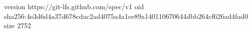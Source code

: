 version https://git-lfs.github.com/spec/v1
oid sha256:4e3d6d4a37d678cdac2ad4075a4a1ce89a140110670644dbb264cf626ad4fad0
size 2752
